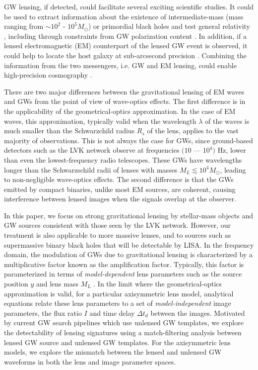 \documentclass[floats,floatfix,showpacs,amssymb,prd,twocolumn,superscriptaddress,nofootinbib,nolongbibliography,reprint]{revtex4-2}
\begin{document}
GW lensing, if detected, could facilitate several exciting scientific studies. It could be used to extract information about the existence of intermediate-mass (mass ranging from $\sim 10^2$ - $10^5 M_\odot$) \cite{Lai:2018rto} or primordial black holes \cite{Diego:2019rzc, Oguri:2020ldf} and test general relativity \cite{Baker:2016reh, Collett:2016dey, Mukherjee:2019wcg}, including through constraints from GW polarization content \cite{PhysRevD.103.024038}. In addition, if a lensed electromagnetic (EM) counterpart of the lensed GW event is observed, it could help to locate the host galaxy at sub-arcsecond precision \cite{Hannuksela:2020xor}. Combining the information from the two messengers, i.e. GW and EM lensing, could enable high-precision cosmography \cite{Sereno:2011ty, Liao:2017ioi, Cao:2019kgn, Li:2019rns, Yu:2020agu, wempe2022lensing}.

There are two major differences between the gravitational lensing of EM waves and GWs from the point of view of wave-optics effects. The first difference is in the applicability of the geometrical-optics approximation.
In the case of EM waves, this approximation, typically valid when the wavelength $\lambda$ of the waves is much smaller than the Schwarzchild radius $R_s$ of the lens, applies to the vast majority of observations. This is not always the case for GWs, since ground-based detectors such as the LVK network observe at frequencies $(10$ --- $10^4)$ Hz, lower than even the lowest-frequency radio telescopes. These GWs have wavelengths longer than the Schwarzschild radii of lenses with masses $M_L \lesssim 10^4 M_\odot$, leading to non-negligible wave-optics effects. The second difference is that the GWs emitted by compact binaries, unlike most EM sources, are coherent, causing interference between lensed images when the signals overlap at the observer.

In this paper, we focus on strong gravitational lensing by stellar-mass objects and GW sources consistent with those seen by the LVK network. However, our treatment is also applicable to more massive lenses, and to sources such as supermassive binary black holes that will be detectable by LISA. In the frequency domain, the modulation of GWs due to gravitational lensing is characterized by a multiplicative factor known as the amplification factor. Typically, this factor is parameterized in terms of \emph{model-dependent} lens parameters such as the source position $y$ and lens mass $M_L$ \cite{1999PThPS.133..137N, Takahashi_2003}. In the limit where the geometrical-optics approximation is valid, for a particular axisymmetric lens model, analytical equations relate these lens parameters to a set of \emph{model-independent} image parameters, the flux ratio $I$ and time delay $\Delta t_d$ between the images. Motivated by current GW search pipelines which use unlensed GW templates, we explore the detectability of lensing signatures using a match-filtering analysis between lensed GW source and unlensed GW templates. For the axisymmetric lens models, we explore the mismatch between the lensed and unlensed GW waveforms in both the lens and image parameter spaces.
\end{document}

